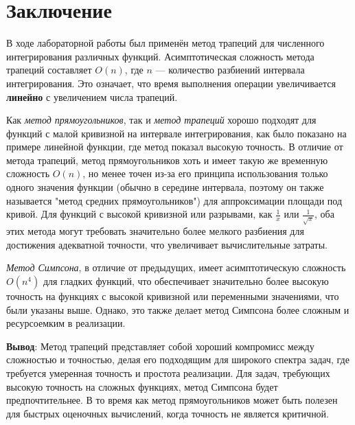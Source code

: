 \newpage
\section{Заключение}

В ходе лабораторной работы был применён метод трапеций для численного интегрирования различных функций. Асимптотическая сложность метода трапеций составляет \textbf{$O(n)$}, где $n$ — количество разбиений интервала интегрирования. Это означает, что время выполнения операции увеличивается \textbf{линейно} с увеличением числа трапеций.

Как \textit{метод прямоугольников}, так и \textit{метод трапеций} хорошо подходят для функций с малой кривизной на интервале интегрирования, как было показано на примере линейной функции, где метод показал высокую точность. В отличие от метода трапеций, метод прямоугольников хоть и имеет такую же временную сложность $O(n)$, но менее точен из-за его принципа использования только одного значения функции (обычно в середине интервала, поэтому он также называется "метод средних прямоугольников") для аппроксимации площади под кривой. Для функций с высокой кривизной или разрывами, как $\frac{1}{x}$ или $\frac{1}{\sqrt{x}}$, оба этих метода могут требовать значительно более мелкого разбиения для достижения адекватной точности, что увеличивает вычислительные затраты.

\textit{Метод Симпсона}, в отличие от предыдущих, имеет асимптотическую сложность \(O(n^4)\) для гладких функций, что обеспечивает значительно более высокую точность на функциях с высокой кривизной или переменными значениями, что были указаны выше. Однако, это также делает метод Симпсона более сложным и ресурсоемким в реализации.

\textbf{Вывод}:
Метод трапеций представляет собой хороший компромисс между сложностью и точностью, делая его подходящим для широкого спектра задач, где требуется умеренная точность и простота реализации. Для задач, требующих высокую точность на сложных функциях, метод Симпсона будет предпочтительнее. В то время как метод прямоугольников может быть полезен для быстрых оценочных вычислений, когда точность не является критичной.


